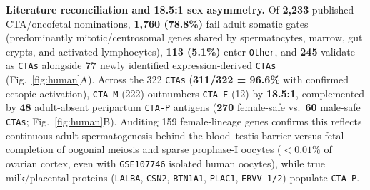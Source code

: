 \documentclass[10pt,letterpaper]{article}
\begin{document}
\textbf{Literature reconciliation and 18.5:1 sex asymmetry.} Of \textbf{2,233} published CTA/oncofetal nominations, \textbf{1,760 (78.8\%)} fail adult somatic gates (predominantly mitotic/centrosomal genes shared by spermatocytes, marrow, gut crypts, and activated lymphocytes), \textbf{113 (5.1\%)} enter \texttt{Other}, and \textbf{245} validate as \texttt{CTAs} alongside \textbf{77} newly identified expression-derived \texttt{CTAs} (Fig.~\ref{fig:human}A). Across the 322 \texttt{CTAs} (\textbf{311/322 = 96.6\%} with confirmed ectopic activation), \texttt{CTA-M} (222) outnumbers \texttt{CTA-F} (12) by \textbf{18.5:1}, complemented by \textbf{48} adult-absent peripartum \texttt{CTA-P} antigens (\textbf{270} female-safe vs.\ \textbf{60} male-safe \texttt{CTAs}; Fig.~\ref{fig:human}B). Auditing 159 female-lineage genes confirms this reflects continuous adult spermatogenesis behind the blood--testis barrier versus fetal completion of oogonial meiosis and sparse prophase-I oocytes ($<0.01\%$ of ovarian cortex, even with \texttt{GSE107746} isolated human oocytes), while true milk/placental proteins (\texttt{LALBA}, \texttt{CSN2}, \texttt{BTN1A1}, \texttt{PLAC1}, \texttt{ERVV-1/2}) populate \texttt{CTA-P}.
\end{document}
